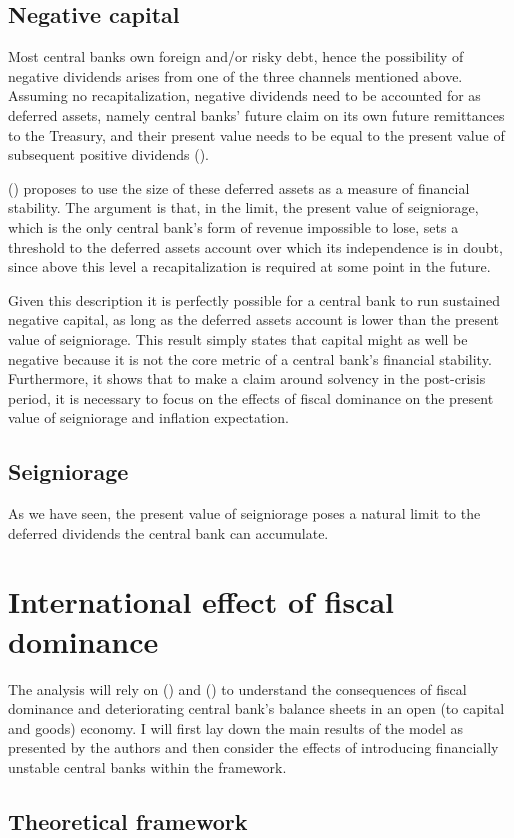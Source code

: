 \documentclass[american]{scrartcl}
\newcommand{\citein}[1]{\citeauthor{#1} (\citeyear{#1})}
\begin{document}
\subsection{Negative capital}

Most central banks own foreign and/or risky debt, hence the possibility of negative dividends arises from one of the three channels mentioned above. Assuming no recapitalization, negative dividends need to be accounted for as deferred assets, namely central banks' future claim on its own future remittances to the Treasury, and their present value needs to be equal to the present value of subsequent positive dividends (\cite{Archer2013}).

\citein{Reis2015} proposes to use the size of these deferred assets as a measure of financial stability. The argument is that, in the limit, the present value of seigniorage, which is the only central bank's form of revenue impossible to lose, sets a threshold to the deferred assets account over which its independence is in doubt, since above this level a recapitalization is required at some point in the future. %

Given this description it is perfectly possible for a central bank to run sustained negative capital, as long as the deferred assets account is lower than the present value of seigniorage. This result simply states that capital might as well be negative because it is not the core metric of a central bank's financial stability. Furthermore, it shows that to make a claim around solvency in the post-crisis period, it is necessary to focus on the effects of fiscal dominance on the present value of seigniorage and inflation expectation.

\subsection{Seigniorage}

As we have seen, the present value of seigniorage poses a natural limit to the deferred dividends the central bank can accumulate.

\section{International effect of fiscal dominance}

The analysis will rely on \citein{Caballero2016} and \citein{Cook2013} to understand the consequences of fiscal dominance and deteriorating central bank's balance sheets in an open (to capital and goods) economy. I will first lay down the main results of the model as presented by the authors and then consider the effects of introducing financially unstable central banks within the framework.

\subsection{Theoretical framework}



\newpage
\printbibliography
\end{document}
